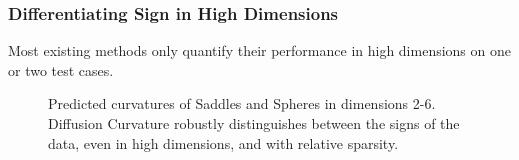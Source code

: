 \documentclass[
  letterpaper,
  DIV=11,
  numbers=noendperiod]{scrartcl}
\theoremstyle{plain}
\theoremstyle{plain}
\theoremstyle{definition}
\theoremstyle{plain}
\theoremstyle{definition}
\theoremstyle{remark}
\begin{document}
\subsubsection{Differentiating Sign in High
Dimensions}\label{differentiating-sign-in-high-dimensions}

Most existing methods only quantify their performance in high dimensions
on one or two test cases.

\begin{figure}[H]


\caption{\label{fig-sadspheres}Predicted curvatures of Saddles and
Spheres in dimensions 2-6. Diffusion Curvature robustly distinguishes
between the signs of the data, even in high dimensions, and with
relative sparsity.}

\end{figure}%
\end{document}
